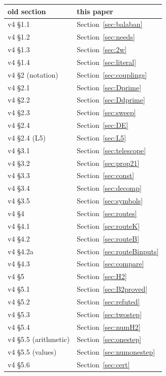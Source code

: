 \begin{longtable}{|p{6cm}|p{6cm}|}
\hline
old section & this paper \\ \hline
\endhead
v4 \S1.1 & Section~\ref{sec:balaban} \\ \hline
v4 \S1.2 & Section~\ref{sec:needs} \\ \hline
v4 \S1.3 & Section~\ref{sec:2w} \\ \hline
v4 \S1.4 & Section~\ref{sec:literal} \\ \hline
v4 \S2 (notation) & Section~\ref{sec:couplings} \\ \hline
v4 \S2.1 & Section~\ref{sec:Dprime} \\ \hline
v4 \S2.2 & Section~\ref{sec:Ddprime} \\ \hline
v4 \S2.3 & Section~\ref{sec:sweep} \\ \hline
v4 \S2.4 & Section~\ref{sec:DE} \\ \hline
v4 \S2.4 (L5) & Section~\ref{sec:L5} \\ \hline
v4 \S3.1 & Section~\ref{sec:telescope} \\ \hline
v4 \S3.2 & Section~\ref{sec:prop21} \\ \hline
v4 \S3.3 & Section~\ref{sec:const} \\ \hline
v4 \S3.4 & Section~\ref{sec:decomp} \\ \hline
v4 \S3.5 & Section~\ref{sec:symbols} \\ \hline
v4 \S4 & Section~\ref{sec:routes} \\ \hline
v4 \S4.1 & Section~\ref{sec:routeK} \\ \hline
v4 \S4.2 & Section~\ref{sec:routeB} \\ \hline
v4 \S4.2a & Section~\ref{sec:routeBinputs} \\ \hline
v4 \S4.3 & Section~\ref{sec:compare} \\ \hline
v4 \S5 & Section~\ref{sec:H2} \\ \hline
v4 \S5.1 & Section~\ref{sec:B2proved} \\ \hline
v4 \S5.2 & Section~\ref{sec:refuted} \\ \hline
v4 \S5.3 & Section~\ref{sec:twostep} \\ \hline
v4 \S5.4 & Section~\ref{sec:numH2} \\ \hline
v4 \S5.5 (arithmetic) & Section~\ref{sec:onestep} \\ \hline
v4 \S5.5 (values) & Section~\ref{sec:numonestep} \\ \hline
v4 \S5.6 & Section~\ref{sec:cert} \\ \hline

\end{longtable}

